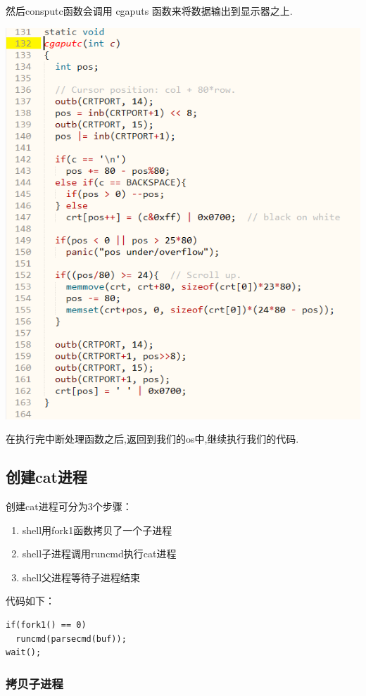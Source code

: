然后consputc函数会调用 cgaputs 函数来将数据输出到显示器之上.

\includegraphics[width=6in]{figures/input/image12.png}

在执行完中断处理函数之后,返回到我们的os中,继续执行我们的代码.


\subsection{创建cat进程}

创建cat进程可分为3个步骤：

\begin{enumerate}
\item shell用fork1函数拷贝了一个子进程
\item shell子进程调用runcmd执行cat进程
\item shell父进程等待子进程结束
\end{enumerate}

代码如下：

\begin{verbatim}
if(fork1() == 0)
  runcmd(parsecmd(buf));
wait();
\end{verbatim}

\subsubsection{拷贝子进程}

